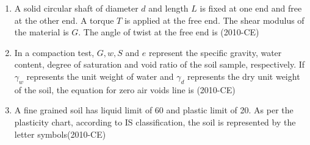 \documentclass[journal,12pt,twocolumn]{IEEEtran}
\theoremstyle{remark}
\begin{document}
\begin{enumerate}
\item A solid circular shaft of diameter $d$ and length $L$ is fixed at one end and free at the other end. A torque $T$ is applied at the free end. The shear modulus of the material is $G$. The angle of twist at the free end is \hfill{(2010-CE)}

\begin{enumerate}
\end{enumerate}
	
\item  In a compaction test, $G, w, S$ and $e$ represent the specific gravity, water content, degree of saturation and void ratio of the soil sample, respectively. If $\gamma_{w}$ represents the unit weight of water and $\gamma_{d}$ represents the dry unit weight of the soil, the equation for zero air voids line is \hfill{(2010-CE)}

\begin{enumerate}
\end{enumerate}
	

\item A fine grained soil has liquid limit of 60 and plastic limit of 20. As per the plasticity chart, according to IS classification, the soil is represented by the letter symbols\hfill{(2010-CE)}


\end{enumerate}
\end{document}
